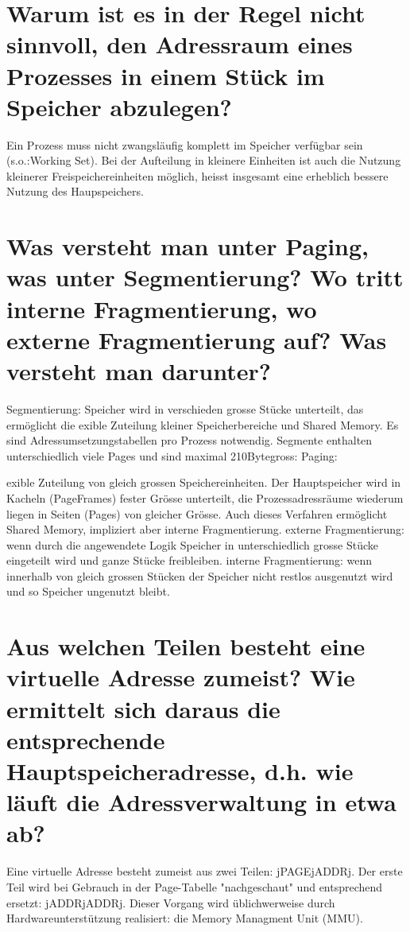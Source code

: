 \documentclass[12pt,a4paper,ngerman]{scrartcl}
\newcommand{\question}[1]{#1}
\newenvironment {answer}
                {}
                {}
\begin{document}
\section{\question{Warum ist es in der Regel nicht sinnvoll, den Adressraum eines Prozesses in einem Stück im Speicher abzulegen?}}
\begin{answer}
Ein Prozess muss nicht zwangsläufig komplett im Speicher verfügbar sein (s.o.:Working
Set). Bei der Aufteilung in kleinere Einheiten ist auch die Nutzung kleinerer Freispeichereinheiten
möglich, heisst insgesamt eine erheblich bessere Nutzung des Haupspeichers.
\end{answer}

\section{\question{Was versteht man unter Paging, was unter Segmentierung? Wo tritt interne Fragmentierung, wo externe Fragmentierung auf? Was versteht man darunter?}}
\begin{answer}
Segmentierung:
Speicher wird in verschieden grosse Stücke unterteilt, das ermöglicht die 
exible Zuteilung
kleiner Speicherbereiche und Shared Memory.
Es sind Adressumsetzungstabellen pro Prozess notwendig.
Segmente enthalten unterschiedlich viele Pages und sind maximal 210Bytegross:
Paging:

exible Zuteilung von gleich grossen Speichereinheiten. Der Hauptspeicher wird in Kacheln (PageFrames)
fester Grösse unterteilt, die Prozessadressräume wiederum liegen in Seiten (Pages) von
gleicher Grösse. Auch dieses Verfahren ermöglicht Shared Memory, impliziert aber interne Fragmentierung.
externe Fragmentierung: wenn durch die angewendete Logik Speicher in unterschiedlich grosse
Stücke eingeteilt wird und ganze Stücke freibleiben.
interne Fragmentierung: wenn innerhalb von gleich grossen Stücken der Speicher nicht restlos
ausgenutzt wird und so Speicher ungenutzt bleibt.
\end{answer}

\section{\question{Aus welchen Teilen besteht eine virtuelle Adresse zumeist? Wie ermittelt sich daraus die entsprechende Hauptspeicheradresse, d.h. wie läuft die Adressverwaltung in etwa ab?}}
\begin{answer}
Eine virtuelle Adresse besteht zumeist aus zwei Teilen: jPAGEjADDRj. Der erste Teil wird bei
Gebrauch in der Page-Tabelle "nachgeschaut" und entsprechend ersetzt: jADDRjADDRj.
Dieser Vorgang wird üblichwerweise durch Hardwareunterstützung realisiert: die Memory Managment
Unit (MMU).
\end{answer}
\end{document}
